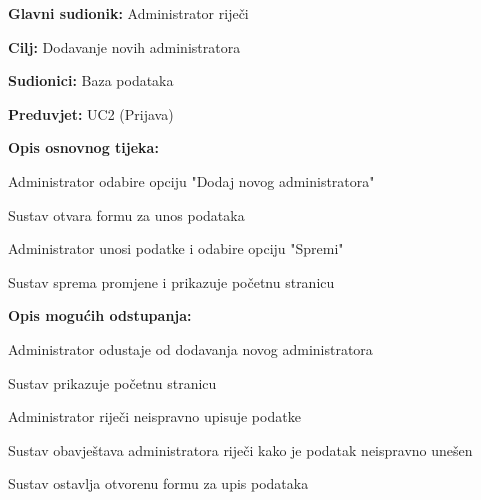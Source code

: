 					\noindent {}
				\begin{packed_item}
					
					\item \textbf{Glavni sudionik: }Administrator riječi
					\item  \textbf{Cilj:} Dodavanje novih administratora
					\item  \textbf{Sudionici:} Baza podataka
					\item  \textbf{Preduvjet:} UC2 (Prijava)
					\item  \textbf{Opis osnovnog tijeka:}
					
					\item[] \begin{packed_enum}
						
						\item Administrator odabire opciju "Dodaj novog administratora"
						\item Sustav otvara formu za unos podataka
						\item Administrator unosi podatke i odabire opciju "Spremi"
						\item Sustav sprema promjene i prikazuje početnu stranicu
					\end{packed_enum}
					
					\item  \textbf{Opis mogućih odstupanja:}
					
					\item[] \begin{packed_item}
						
						\item[3.a] Administrator odustaje od dodavanja novog administratora
						\item[] \begin{packed_enum}
							
							\item Sustav prikazuje početnu stranicu
							
						\end{packed_enum}
						
						\item[3.b] Administrator riječi neispravno upisuje podatke
						\item[] \begin{packed_enum}
							
							\item Sustav obavještava administratora riječi kako je podatak neispravno unešen
							\item Sustav ostavlja otvorenu formu za upis podataka
							
						\end{packed_enum}
						
					\end{packed_item}
				\end{packed_item}
				
